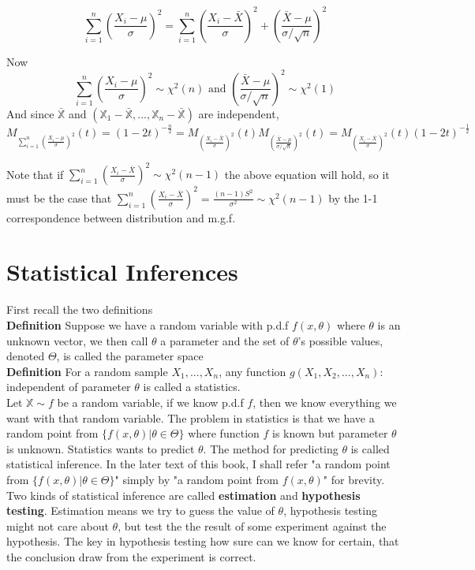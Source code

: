 \documentclass[a4paper,12pt]{article}
\begin{document}
$$\sum_{i=1}^n (\frac{X_i-\mu}{\sigma})^2 = \sum_{i=1}^n (\frac{X_i-\bar{X}}{\sigma})^2 + (\frac{\bar{X}-\mu}{\sigma/\sqrt{n}})^2$$

Now
$$\sum_{i=1}^n (\frac{X_i-\mu}{\sigma})^2 \sim \chi^2(n) \text{ and } (\frac{\bar{X}-\mu}{\sigma/\sqrt{n}})^2 \sim \chi^2(1)$$
And since $\bar{\mathbb{X}}$ and $(\mathbb{X}_1-\bar{\mathbb{X}}, ..., \mathbb{X}_n-\bar{\mathbb{X}})$ are independent,
$$M_{\sum_{i=1}^n (\frac{X_i-\mu}{\sigma})^2}(t) = (1-2t)^{-\frac{n}{2}} = M_{(\frac{X_i-\bar{X}}{\sigma})^2}(t)M_{(\frac{\bar{X}-\mu}{\sigma/\sqrt{n}})^2}(t) = M_{(\frac{X_i-\bar{X}}{\sigma})^2}(t)(1-2t)^{-\frac{1}{2}}$$

Note that if $\sum_{i=1}^n(\frac{X_i-\bar{X}}{\sigma})^2 \sim \chi^2(n-1)$ the above equation will hold, so it must be the case that $\sum_{i=1}^n(\frac{X_i-\bar{X}}{\sigma})^2 = \frac{(n-1)S^2}{\sigma^2} \sim \chi^2(n-1)$ by the 1-1 correspondence between distribution and m.g.f.

\newpage
\section{Statistical Inferences}

First recall the two definitions\\

\textbf{Definition}
Suppose we have a random variable with p.d.f $f(x, \theta)$ where $\theta$ is an unknown vector, we then call $\theta$ a parameter and the set of $\theta$'s possible values, denoted $\Theta$, is called the parameter space\\

\textbf{Definition}
For a random sample $X_1, ..., X_n$, any function $g(X_1, X_2, ..., X_n): $ independent of parameter $\theta$ is called a statistics.\\

Let $\mathbb{X} \sim f$ be a random variable, if we know p.d.f $f$, then we know everything we want with that random variable. The problem in statistics is that we have a random point from $\{ f(x, \theta) | \theta\in\Theta \}$ where function $f$ is known but parameter $\theta$ is unknown. Statistics wants to predict $\theta$. The method for predicting $\theta$ is called statistical inference. In the later text of this book, I shall refer "a random point from $\{ f(x, \theta) | \theta\in\Theta \}$" simply by "a random point from $f(x, \theta)$" for brevity.\\

Two kinds of statistical inference are called \textbf{estimation} and \textbf{hypothesis testing}. Estimation means we try to guess the value of $\theta$, hypothesis testing might not care about $\theta$, but test the the result of some experiment against the hypothesis. The key in hypothesis testing how sure can we know for certain, that the conclusion draw from the experiment is correct.\\
\end{document}
